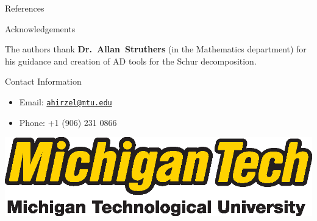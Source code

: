 \documentclass[final]{beamer}
\newlength{\onecolwid}
\begin{document}
\begin{frame}[t]
\begin{columns}[t]
\begin{column}{\onecolwid}
\begin{block}{References}

\small{
\vspace{0.75in}}

\end{block}



\begin{block}{Acknowledgements}

The authors thank \textbf{Dr.~Allan~Struthers} (in the Mathematics department)
for his guidance and creation of AD tools for the Schur decomposition.

\end{block}



\begin{block}{Contact Information}

\begin{itemize}
\item Email: \href{mailto:ahirzel@mtu.edu}{\texttt{ahirzel@mtu.edu}}
\item Phone: +1 (906) 231 0866
\end{itemize}

\end{block}

\begin{center}
\includegraphics[width=0.4\linewidth]{logo_withfullname_LG.eps}
\end{center}


\end{column} %

\end{columns} %

\end{frame} %
\end{document}
